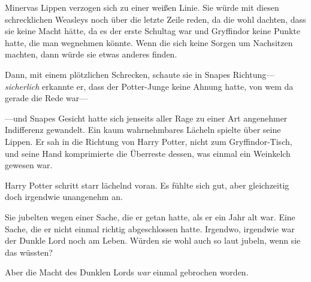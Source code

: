 Minervas Lippen verzogen sich zu einer weißen Linie. Sie würde mit diesen schrecklichen Weasleys noch über die letzte Zeile reden, da die wohl dachten, dass sie keine Macht hätte, da es der erste Schultag war und Gryffindor keine Punkte hatte, die man wegnehmen könnte. Wenn die sich keine Sorgen um Nachsitzen machten, dann würde sie etwas anderes finden.

Dann, mit einem plötzlichen Schrecken, schaute sie in Snapes Richtung—\emph{sicherlich} erkannte er, dass der Potter-Junge keine Ahnung hatte, von wem da gerade die Rede war—

—und Snapes Gesicht hatte sich jenseits aller Rage zu einer Art angenehmer Indifferenz gewandelt. Ein kaum wahrnehmbares Lächeln spielte über seine Lippen. Er sah in die Richtung von Harry Potter, nicht zum Gryffindor-Tisch, und seine Hand komprimierte die Überreste dessen, was einmal ein Weinkelch gewesen war.

\later

Harry Potter schritt starr lächelnd voran. Es fühlte sich gut, aber gleichzeitig doch irgendwie unangenehm an.

Sie jubelten wegen einer Sache, die er getan hatte, als er ein Jahr alt war. Eine Sache, die er nicht einmal richtig abgeschlossen hatte. Irgendwo, irgendwie war der Dunkle Lord noch am Leben. Würden sie wohl auch so laut jubeln, wenn sie das wüssten?

Aber die Macht des Dunklen Lords \emph{war} einmal gebrochen worden.

